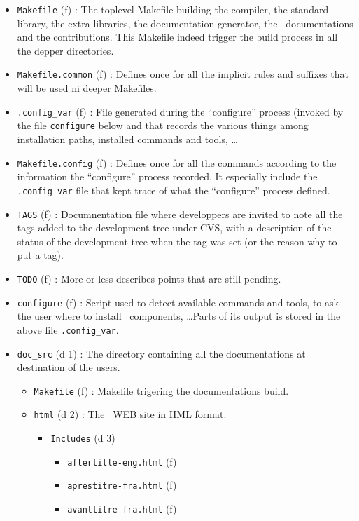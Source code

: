 \begin{itemize}
\item {\tt Makefile} (f) : The toplevel Makefile building the
  compiler, the standard library, the extra libraries, the
  documentation generator, the \focalize\ documentations and the
  contributions. This Makefile indeed trigger the build process in all
  the depper directories.
\item {\tt Makefile.common} (f) : Defines once for all the implicit
  rules and suffixes that will be used ni deeper Makefiles.
\item {\tt .config\_var} (f) : File generated during the ``configure''
  process (invoked by the file {\tt configure} below and that records
  the various things among installation paths, installed commands and
  tools, \ldots
\item {\tt Makefile.config} (f) : Defines once for all the commands
  according to the information the ``configure'' process recorded. It
  especially include the {\tt .config\_var} file that kept trace of what
  the ``configure'' process defined.
\item {\tt TAGS} (f) : Documnentation file where developpers are
  invited to note all the tags added to the development tree under CVS,
  with a description of the status of the development tree when the
  tag was set (or the reason why to put a tag).
\item {\tt TODO} (f) : More or less describes points that are still
  pending.
\item {\tt configure} (f) : Script used to detect available commands
  and tools, to ask the user where to install \focalize\ components,
  \ldots Parts of its output is stored in the above file
  {\tt .config\_var}.
\item {\tt doc\_src} (d 1) : The directory containing all the
  documentations at destination of the users.
  \begin{itemize}
  \item {\tt Makefile} (f) : Makefile trigering the documentations
    build.
  \item {\tt html} (d 2) : The \focalize\ WEB site in HML format.
    \begin{itemize}
    \item {\tt Includes} (d 3)
      \begin{itemize}
      \item {\tt aftertitle-eng.html} (f)
      \item {\tt aprestitre-fra.html} (f)
      \item {\tt avanttitre-fra.html} (f)

\end{itemize}
\end{itemize}
\end{itemize}
\end{itemize}
